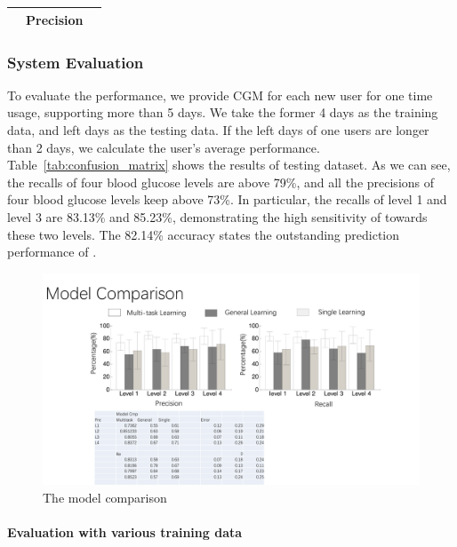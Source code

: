 \begin{table}[]
\begin{tabular}{|c|c|c|c|c|l|l|}
\multicolumn{1}{|l|}{}                                                           & \multicolumn{4}{c|}{\textbf{Precision}}                                                                                 & \multicolumn{2}{l|}{}                                                                             \\ \hline
\end{tabular}
\end{table}



\subsubsection{System Evaluation}

To evaluate the \sysname performance, we provide CGM for each new user for one time usage, supporting more than 5 days. We take the former 4 days as the training data, and left days as the testing data. If the left days of one users are longer than 2 days, we calculate the user's average performance. Table~\ref{tab:confusion_matrix} shows the results of testing dataset. As we can see,  the recalls of four blood glucose levels are above 79\%, and all the precisions of four blood glucose levels keep above 73\%. In particular, the recalls of level 1 and level 3 are 83.13\% and 85.23\%, demonstrating the high sensitivity of \sysname towards these two levels. The 82.14\% accuracy states the outstanding prediction performance of \sysname.



\begin{figure}[!t]
\centering
\includegraphics[width=0.9\columnwidth]{./img/CMP_Models.pdf}
\caption{The model comparison}
\label{fig:cmp_model}
\end{figure}

\paragraph{Evaluation with various training data}

